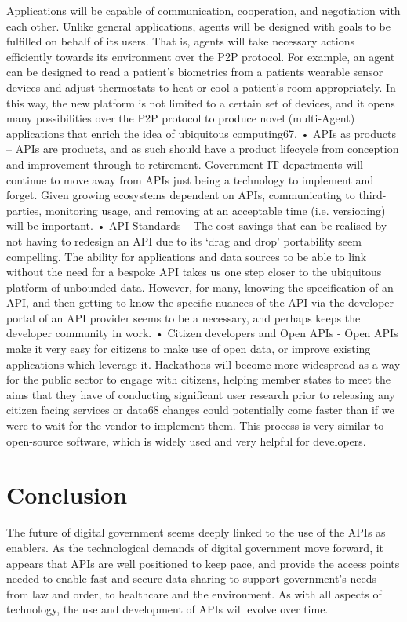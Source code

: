 Applications will be capable of communication, cooperation, and negotiation with each other. Unlike
general applications, agents will be designed with goals to be fulfilled on behalf of its users. That is,
agents will take necessary actions efficiently towards its environment over the P2P protocol. For
example, an agent can be designed to read a patient’s biometrics from a patients wearable sensor
devices and adjust thermostats to heat or cool a patient’s room appropriately. In this way, the new
platform is not limited to a certain set of devices, and it opens many possibilities over the P2P
protocol to produce novel (multi-Agent) applications that enrich the idea of ubiquitous computing67.
• APIs as products – APIs are products, and as such should have a product lifecycle from
conception and improvement through to retirement. Government IT departments will continue to
move away from APIs just being a technology to implement and forget. Given growing ecosystems
dependent on APIs, communicating to third-parties, monitoring usage, and removing at an
acceptable time (i.e. versioning) will be important.
• API Standards – The cost savings that can be realised by not having to redesign an API due to its
‘drag and drop’ portability seem compelling. The ability for applications and data sources to be able
to link without the need for a bespoke API takes us one step closer to the ubiquitous platform of
unbounded data. However, for many, knowing the specification of an API, and then getting to know
the specific nuances of the API via the developer portal of an API provider seems to be a
necessary, and perhaps keeps the developer community in work.
• Citizen developers and Open APIs - Open APIs make it very easy for citizens to make use of
open data, or improve existing applications which leverage it. Hackathons will become more
widespread as a way for the public sector to engage with citizens, helping member states to meet
the aims that they have of conducting significant user research prior to releasing any citizen facing
services or data68 changes could potentially come faster than if we were to wait for the vendor to
implement them. This process is very similar to open-source software, which is widely used and
very helpful for developers.

\section{Conclusion}

The future of digital government seems deeply linked to the use of the APIs as enablers. As the
technological demands of digital government move forward, it appears that APIs are well positioned to keep
pace, and provide the access points needed to enable fast and secure data sharing to support
government’s needs from law and order, to healthcare and the environment. As with all aspects of
technology, the use and development of APIs will evolve over time.
